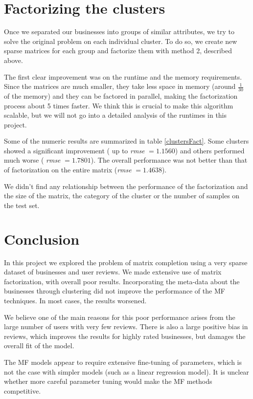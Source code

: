\documentclass[12pt]{article}
\begin{document}
\begin{multicols}{2}
\section{Factorizing the clusters}

Once we separated our businesses into groups of similar attributes, we try to solve the original problem on each individual cluster. To do so, we create new sparse matrices for each group and factorize them with method 2, described above. 

The first clear improvement was on the runtime and the memory requirements. Since the matrices are much smaller, they take less space in memory (around $\frac{1}{30}$ of the memory) and they can be factored in parallel, making the factorization process about 5 times faster. We think this is crucial to make this algorithm scalable, but we will not go into a detailed analysis of the runtimes in this project.

Some of the numeric results are summarized in table \ref{clustersFact}. Some clusters showed a significant improvement ( up to \emph{rmse} $= 1.1560$) and others performed much worse ( \emph{rmse} $= 1.7801$). The overall performance was not better than that of factorization on the entire matrix (\emph{rmse} $= 1.4638 $).

We didn't find any relationship between the performance of the factorization and the size of the matrix, the category of the cluster or the number of samples on the test set. 

\section{Conclusion}

In this project we explored the problem of matrix completion using a very sparse dataset of businesses and user reviews. We made extensive use of matrix factorization, with overall poor results. Incorporating the meta-data about the businesses through clustering did not improve the performance of the MF techniques. In most cases, the results worsened.

We believe one of the main reasons for this poor performance arises from the large number of users with very few reviews. There is also a large positive bias in reviews, which improves the results for highly rated businesses, but damages the overall fit of the model. 

The MF models appear to require extensive fine-tuning of parameters, which is not the case with simpler models (such as a linear regression model). It is unclear whether more careful parameter tuning would make the MF methods competitive.


\end{multicols}
\end{document}
